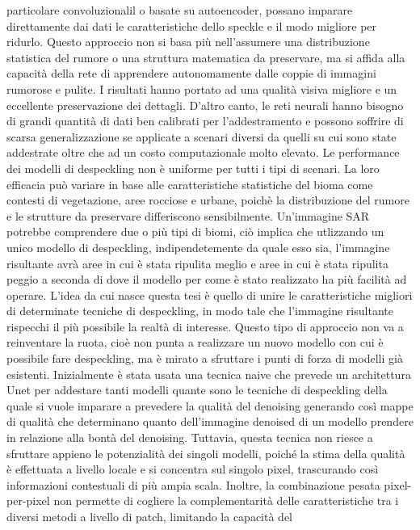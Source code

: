 particolare convoluzionalil o basate su autoencoder, possano imparare direttamente dai dati le caratteristiche
dello speckle e il modo migliore per ridurlo. Questo approccio non si basa più nell'assumere una distribuzione 
statistica del rumore o una struttura matematica da preservare, ma si affida alla capacità della rete di 
apprendere autonomamente dalle coppie di immagini rumorose e pulite. I risultati hanno portato ad una qualità 
visiva migliore e un eccellente preservazione dei dettagli. D'altro canto, le reti neurali hanno bisogno 
di grandi quantità di dati ben calibrati per l'addestramento e possono soffrire di scarsa generalizzazione se 
applicate a scenari diversi da quelli su cui sono state addestrate oltre che ad un costo computazionale molto elevato. 
Le performance dei modelli di despeckling non è uniforme per tutti i tipi di scenari. La loro efficacia può variare
in base alle caratteristiche statistiche del bioma come contesti di vegetazione, aree rocciose e urbane, 
poichè la distribuzione del rumore e le strutture da preservare differiscono sensibilmente. Un'immagine SAR potrebbe 
comprendere due o più tipi di biomi, ciò implica che utlizzando un unico modello di despeckling, 
indipendetemente da quale esso sia, l'immagine risultante avrà aree in cui è stata ripulita meglio e aree in cui è 
stata ripulita peggio a seconda di dove il modello per come è stato realizzato ha più facilità ad operare.
L'idea da cui nasce questa tesi è quello di unire le caratteristiche migliori di determinate tecniche di despeckling, 
in modo tale che l'immagine risultante rispecchi il più possibile la realtà di interesse. Questo tipo di approccio non va a 
reinventare la ruota, cioè non punta a realizzare un nuovo modello con cui è possibile fare despeckling, ma è mirato
a sfruttare i punti di forza di modelli già esistenti. Inizialmente è stata usata una tecnica naive che 
prevede un architettura Unet per addestare tanti modelli quante sono le tecniche di despeckling 
della quale si vuole imparare a prevedere la qualità del denoising generando così mappe di qualità 
che determinano quanto dell'immagine denoised di un  modello prendere in relazione alla bontà del denoising.
Tuttavia, questa tecnica non riesce a sfruttare appieno le potenzialità dei singoli modelli, poiché la stima 
della qualità è effettuata a livello locale e si concentra sul singolo pixel, trascurando così informazioni 
contestuali di più ampia scala. Inoltre, la combinazione pesata pixel-per-pixel non permette di cogliere la 
complementarità delle caratteristiche tra i diversi metodi a livello di patch, limitando la capacità del 
